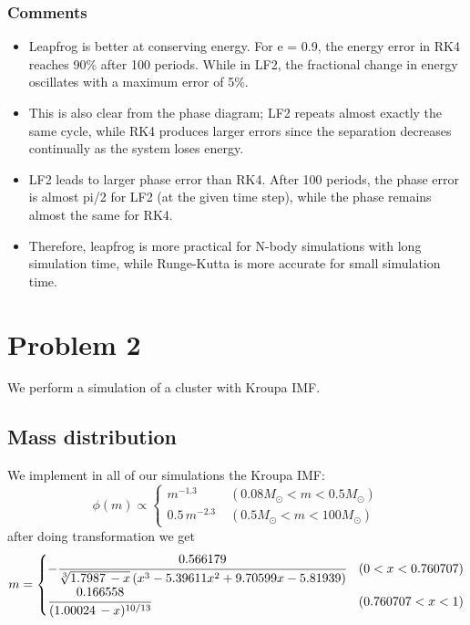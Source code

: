 \subsubsection*{Comments}
\begin{itemize}
	\item  Leapfrog is better at conserving energy. For e = 0.9, the energy error in RK4 reaches 90\% after 100 periods. While in LF2, the fractional change in energy oscillates with a maximum error of 5\%.
	
	\item This is also clear from the phase diagram; LF2 repeats almost exactly the same cycle, while RK4 produces larger errors since the separation decreases continually as the system loses energy.
	
	\item LF2 leads to larger phase error than RK4. After 100 periods, the phase error is almost pi/2 for LF2 (at the given time step), while the phase remains almost the same for RK4.
	
	\item Therefore, leapfrog is more practical for N-body simulations with long simulation time, while Runge-Kutta is more accurate for small simulation time. 
	
\end{itemize}

\section*{Problem 2}
We perform a simulation of a cluster with Kroupa IMF.
\subsection*{Mass distribution}
We implement in all of our simulations the Kroupa IMF:
\begin{equation}
\phi(m) \propto 
\begin{cases}
m^{-1.3} \; &(0.08M_\odot < m < 0.5M_\odot) \\
0.5 \, m^{-2.3} \; &(0.5M_\odot<m<100M_\odot)
\end{cases}
\end{equation}
after doing transformation we get
\begin{equation}
m=
	\begin{cases}
	-\cfrac{0.566179}{\sqrt[3]{1.7987\, - x} \left(x^3-5.39611 
	x^2+9.70599 x-5.81939\right)} & (0<x<0.760707)\\
	\cfrac{0.166558}{(1.00024\, -x)^{10/13}} & (0.760707<x<1)
	\end{cases}
\end{equation}

